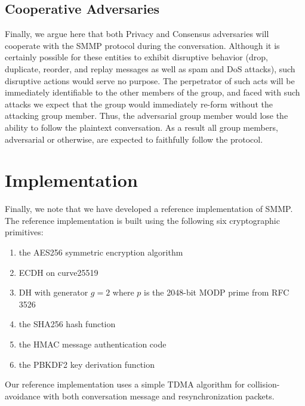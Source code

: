 \documentclass[%
preprint,
amsmath,amssymb,
aps,
prb,
floatfix,
]{revtex4-1}
\begin{document}
\subsection{\label{sec:cooperativeadversaries}Cooperative Adversaries}
Finally, we argue here that both Privacy and Consensus adversaries will
cooperate with the SMMP protocol during the conversation. Although it is
certainly possible for these entities to exhibit disruptive behavior (drop,
duplicate, reorder, and replay messages as well as spam and DoS attacks),
such disruptive actions would serve no purpose. The perpetrator of such acts
will be immediately identifiable to the other members of the group, and faced
with such attacks we expect that the group would immediately re-form without the
attacking group member. Thus, the adversarial group member would lose the
ability to follow the plaintext conversation.  As a result all group members,
adversarial or otherwise, are expected to faithfully follow the protocol.

\section{\label{sec:implementation}Implementation}
Finally, we note that we have developed a reference
implementation\cite{ref:referenceimplementation} of SMMP.
The reference implementation is built using the following six cryptographic
primitives:
\begin{enumerate}
\item the AES256 symmetric encryption algorithm
\item ECDH on curve25519
\item DH with generator $g=2$ where $p$ is the 2048-bit MODP prime from RFC 3526
\item the SHA256 hash function
\item the HMAC message authentication code
\item the PBKDF2 key derivation function
\end{enumerate}
Our reference implementation uses a simple TDMA algorithm for
collision-avoidance with both conversation message and resynchronization
packets.
\end{document}
